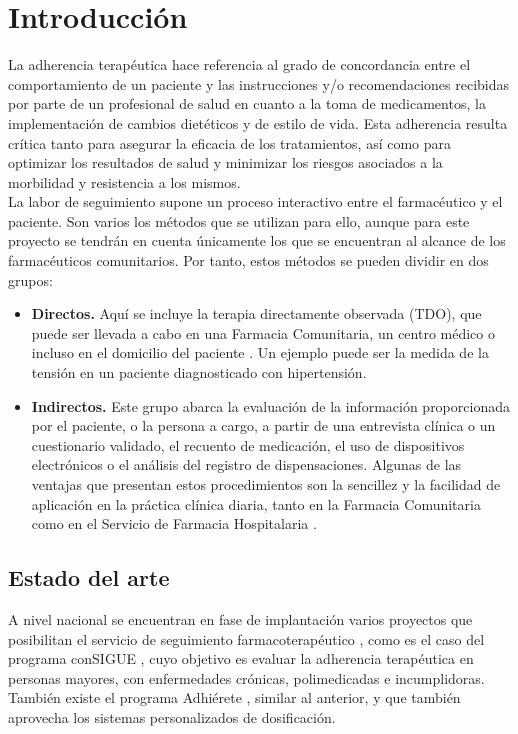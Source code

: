 \chapter{Introducción}

La adherencia terapéutica hace referencia al grado de concordancia entre el comportamiento de un paciente y las instrucciones y/o recomendaciones recibidas por parte de un profesional de salud en cuanto a la toma de medicamentos, la implementación de cambios dietéticos y de estilo de vida. Esta adherencia resulta crítica tanto para asegurar la eficacia de los tratamientos, así como para optimizar los resultados de salud y minimizar los riesgos asociados a la morbilidad y resistencia a los mismos. \\

La labor de seguimiento supone un proceso interactivo entre el farmacéutico y el paciente. Son varios los métodos que se utilizan para ello, aunque para este proyecto se tendrán en cuenta únicamente los que se encuentran al alcance de los farmacéuticos comunitarios. Por tanto, estos métodos se pueden dividir en dos grupos:
\begin{itemize}
	\item \textbf{Directos.} Aquí se incluye la terapia directamente observada (TDO), que puede ser llevada a cabo en una Farmacia Comunitaria, un centro médico o incluso en el domicilio del paciente \cite{pages2018metodos}. Un ejemplo puede ser la medida de la tensión en un paciente diagnosticado con hipertensión.
	
	\item \textbf{Indirectos.} Este grupo abarca la evaluación de la información proporcionada por el paciente, o la persona a cargo, a partir de una entrevista clínica o un cuestionario validado, el recuento de medicación, el uso de dispositivos electrónicos o el análisis del registro de dispensaciones. Algunas de las ventajas que presentan estos procedimientos son la sencillez y la facilidad de aplicación en la práctica clínica diaria, tanto en la Farmacia Comunitaria como en el Servicio de Farmacia Hospitalaria \cite{pages2018metodos}.
\end{itemize} 

\section{Estado del arte}
A nivel nacional se encuentran en fase de implantación varios proyectos que posibilitan el servicio de seguimiento farmacoterapéutico \cite{CONTHE2014336}, como es el caso del programa conSIGUE \cite{programa_consigue}, cuyo objetivo es evaluar la adherencia terapéutica en personas mayores, con enfermedades crónicas, polimedicadas e incumplidoras. También existe el programa Adhiérete \cite{programa_adhierete_2015}, similar al anterior, y que también aprovecha los sistemas personalizados de dosificación. 

